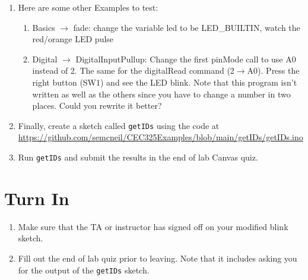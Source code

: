 \begin{enumerate}
	\item Here are some other Examples to test:
	\begin{enumerate}
		\item Basics $\rightarrow$ fade: change the variable led to be LED\_BUILTIN, watch the red/orange LED pulse
		\item Digital $\rightarrow$ DigitalInputPullup: Change the first pinMode call to use A0 instead of 2. The same for 
				the digitalRead command (2$\rightarrow$A0). Press the right button (SW1) and see the LED blink. 
				 Note that this program isn't written as well as the others since you have to change a number in two
				places. Could you rewrite it better?
	\end{enumerate}
    \item Finally, create a sketch called \lstinline$getIDs$ using the code at \\ 
        \href{https://github.com/semcneil/CEC325Examples/blob/main/getIDs/getIDs.ino}{https://github.com/semcneil/CEC325Examples/blob/main/getIDs/getIDs.ino}
    \item Run \lstinline$getIDs$ and submit the results in the end of lab Canvas quiz.
\end{enumerate}


\section{Turn In}
\begin{enumerate}
    \item Make sure that the TA or instructor has signed off on your modified blink sketch.
    \item Fill out the end of lab quiz prior to leaving. Note that it includes asking you 
            for the output of the \lstinline$getIDs$ sketch. 
\end{enumerate}
